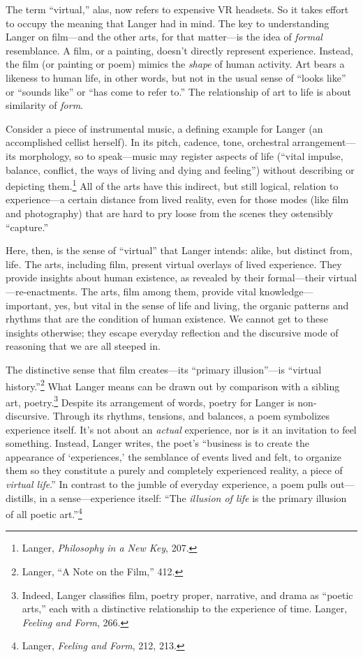 \documentclass{tufte-handout}
\begin{document}
The term ``virtual,'' alas, now refers to expensive VR headsets. So it
takes effort to occupy the meaning that Langer had in mind. The key to
understanding Langer on film---and the other arts, for that matter---is
the idea of \emph{formal} resemblance. A film, or a painting, doesn't
directly represent experience. Instead, the film (or painting or poem)
mimics the \emph{shape} of human activity. Art bears a likeness to human
life, in other words, but not in the usual sense of ``looks like'' or
``sounds like'' or ``has come to refer to.'' The relationship of art to
life is about similarity of \emph{form}.

Consider a piece of instrumental music, a defining example for Langer
(an accomplished cellist herself). In its pitch, cadence, tone,
orchestral arrangement---its morphology, so to speak---music may
register aspects of life (``vital impulse, balance, conflict, the ways
of living and dying and feeling'') without describing or depicting
them.\footnote{Langer, \emph{Philosophy in a New Key}, 207.} All of the
arts have this indirect, but still logical, relation to experience---a
certain distance from lived reality, even for those modes (like film and
photography) that are hard to pry loose from the scenes they ostensibly
``capture.''

Here, then, is the sense of ``virtual'' that Langer intends: alike, but
distinct from, life\emph{.} The arts, including film, present virtual
overlays of lived experience. They provide insights about human
existence, as revealed by their formal---their virtual---re-enactments.
The arts, film among them, provide vital knowledge---important, yes, but
vital in the sense of life and living, the organic patterns and rhythms
that are the condition of human existence. We cannot get to these
insights otherwise; they escape everyday reflection and the discursive
mode of reasoning that we are all steeped in.

The distinctive sense that film creates---its ``primary illusion''---is
``virtual history.''\footnote{Langer, ``A Note on the Film,'' 412.}
What Langer means can be drawn out by comparison with a sibling art,
poetry.\footnote{Indeed, Langer classifies film, poetry proper,
  narrative, and drama as ``poetic arts,'' each with a distinctive
  relationship to the experience of time. Langer, \emph{Feeling and
  Form}, 266.} Despite its arrangement of words, poetry for Langer is
non-discursive. Through its rhythms, tensions, and balances, a poem
symbolizes experience itself. It's not about an \emph{actual}
experience, nor is it an invitation to feel something. Instead, Langer
writes, the poet's ``business is to create the appearance of
`experiences,' the semblance of events lived and felt, to organize them
so they constitute a purely and completely experienced reality, a piece
of \emph{virtual life}.'' In contrast to the jumble of everyday
experience, a poem pulls out---distills, in a sense---experience itself:
``The \emph{illusion of life} is the primary illusion of all poetic
art.''\footnote{Langer, \emph{Feeling and Form}, 212, 213.}
\end{document}
